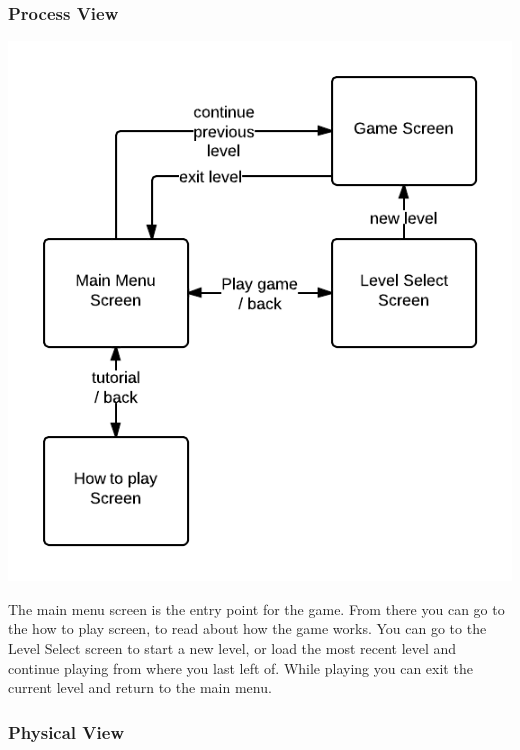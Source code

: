 \subsubsection{Process View} %
\includegraphics[width=\textwidth]{pictures/process_view_screen_flow}

The main menu screen is the entry point for the game. From there you can go to the how to play screen, to read about how the game works. You can go to the Level Select screen to start a new level, or load the most recent level and continue playing from where you last left of. While playing you can exit the current level and return to the main menu.

\subsubsection{Physical View} %

